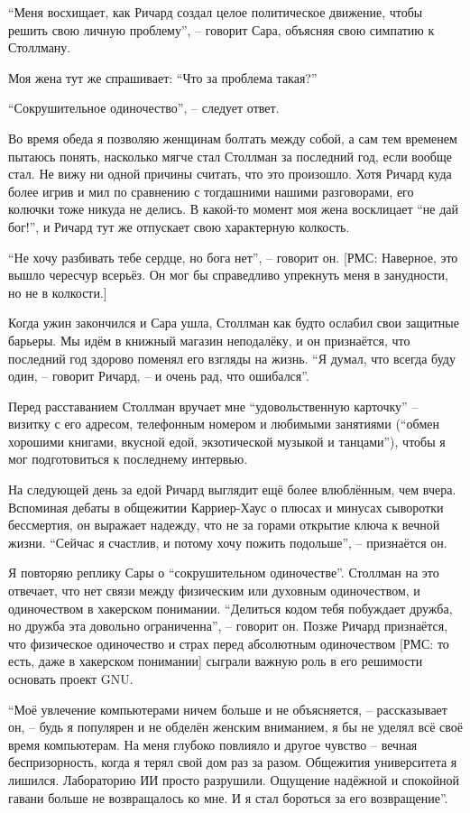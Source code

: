 ``Меня восхищает, как Ричард создал целое политическое движение, чтобы решить свою личную проблему'', -- говорит Сара, объясняя свою симпатию к Столлману.

Моя жена тут же спрашивает: ``Что за проблема такая?''

``Сокрушительное одиночество'', -- следует ответ.

Во время обеда я позволяю женщинам болтать между собой, а сам тем временем пытаюсь понять, насколько мягче стал Столлман за последний год, если вообще стал. Не вижу ни одной причины считать, что это произошло. Хотя Ричард куда более игрив и мил по сравнению с тогдашними нашими разговорами, его колючки тоже никуда не делись. В какой-то момент моя жена восклицает ``не дай бог!'', и Ричард тут же отпускает свою характерную колкость.

``Не хочу разбивать тебе сердце, но бога нет'', -- говорит он. [РМС: Наверное, это вышло чересчур всерьёз. Он мог бы справедливо упрекнуть меня в занудности, но не в колкости.]

Когда ужин закончился и Сара ушла, Столлман как будто ослабил свои защитные барьеры. Мы идём в книжный магазин неподалёку, и он признаётся, что последний год здорово поменял его взгляды на жизнь. ``Я думал, что всегда буду один, -- говорит Ричард, -- и очень рад, что ошибался''.

Перед расставанием Столлман вручает мне ``удовольственную карточку'' -- визитку с его адресом, телефонным номером и любимыми занятиями (``обмен хорошими книгами, вкусной едой, экзотической музыкой и танцами''), чтобы я мог подготовиться к последнему интервью.

На следующей день за едой Ричард выглядит ещё более влюблённым, чем вчера. Вспоминая дебаты в общежитии Карриер-Хаус о плюсах и минусах сыворотки бессмертия, он выражает надежду, что не за горами открытие ключа к вечной жизни. ``Сейчас я счастлив, и потому хочу пожить подольше'', -- признаётся он.

Я повторяю реплику Сары о ``сокрушительном одиночестве''. Столлман на это отвечает, что нет связи между физическим или духовным одиночеством, и одиночеством в хакерском понимании. ``Делиться кодом тебя побуждает дружба, но дружба эта довольно ограниченна'', -- говорит он. Позже Ричард признаётся, что физическое одиночество и страх перед абсолютным одиночеством [РМС: то есть, даже в хакерском понимании] сыграли важную роль в его решимости основать проект GNU.

``Моё увлечение компьютерами ничем больше и не объясняется, -- рассказывает он, -- будь я популярен и не обделён женским вниманием, я бы не уделял всё своё время компьютерам. На меня глубоко повлияло и другое чувство -- вечная беспризорность, когда я терял свой дом раз за разом. Общежития университета я лишился. Лабораторию ИИ просто разрушили. Ощущение надёжной и спокойной гавани больше не возвращалось ко мне. И я стал бороться за его возвращение''.

